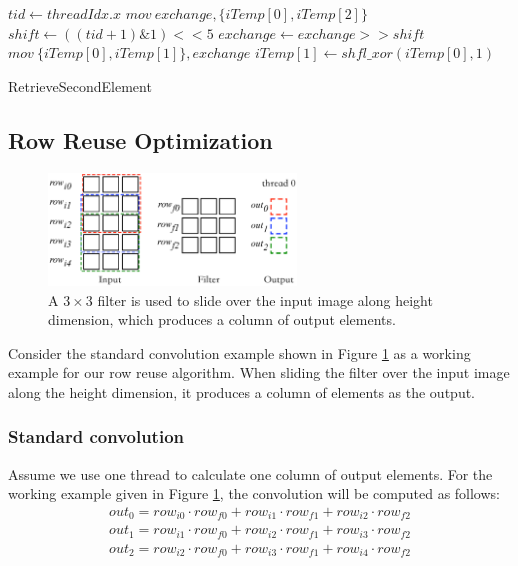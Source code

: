 \begin{algorithm}[t!]
\small
	$tid \gets threadIdx.x$\;
	$mov\ exchange, \{iTemp[0], iTemp[2]\}$\;
	$shift \gets ((tid+1)\&1)<<5$\;
	$exchange \gets exchange >> shift$\;
	$mov\ \{iTemp[0],iTemp[1]\}, exchange$\;
	$iTemp[1] \gets shfl\_xor(iTemp[0],1)$\;	
	\caption{RetrieveSecondElement}
	\label{algo:basic2}
\end{algorithm}


\subsection{Row Reuse Optimization}
\label{sec:rowreuse}
\begin{figure}[t!]
	\centering
	\includegraphics[width=0.8\columnwidth,height=3cm]{./figure/rowreuse.eps}
\caption{A $3 \times 3$ filter is used to slide over the input image along height dimension, which produces a column of output elements.}
\label{fig:rowreuse}
\end{figure}

 Consider the standard convolution example shown in Figure \ref{fig:rowreuse} as a working example for our row reuse algorithm. 
When sliding the filter over the input image along the height dimension, it produces a column of elements as the output.

\subsubsection{Standard convolution} Assume we use one thread to calculate one column of output elements. 
For the working example given in Figure \ref{fig:rowreuse}, the convolution will be computed as follows:
\begin{gather*}
  out_0=row_{i0} \cdot row_{f0} + row_{i1} \cdot row_{f1} + row_{i2} \cdot row_{f2} \\
out_{1}=row_{i1} \cdot row_{f0} + row_{i2} \cdot row_{f1} + row_{i3} \cdot row_{f2} \\
out_{2}=row_{i2} \cdot row_{f0} + row_{i3} \cdot row_{f1} + row_{i4} \cdot row_{f2}
\end{gather*}

